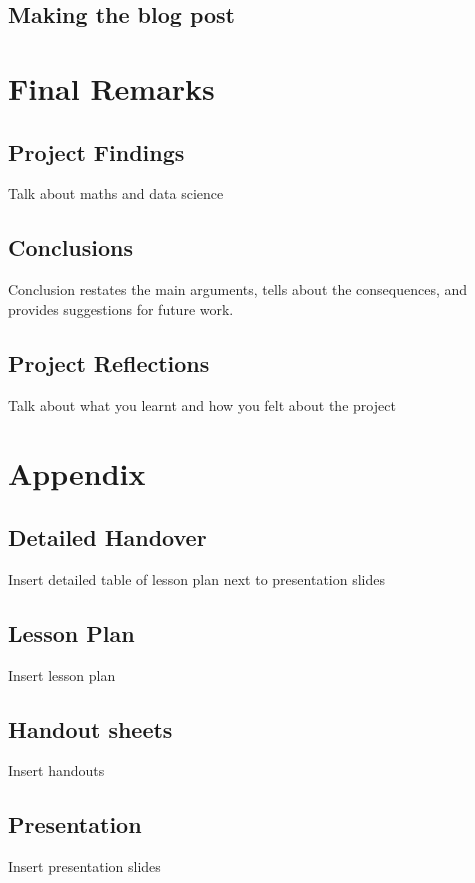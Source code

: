 \documentclass[12pt, a4paper,oneside]{book}
\numberwithin{equation}{section}
\begin{document}
\section{Making the blog post}\label{sec:x.x}


\chapter{Final Remarks}\label{ch:concl}
\section{Project Findings}
Talk about maths and data science

\section{Conclusions}
Conclusion restates the main arguments, tells about the consequences, and provides suggestions for future work.

\section{Project Reflections}
Talk about what you learnt and how you felt about the project

\chapter*{Appendix}
\appendix
{}

\section*{Detailed Handover}
Insert detailed table of lesson plan next to presentation slides

\section*{Lesson Plan}
Insert lesson plan

\section*{Handout sheets}\label{secx}
Insert handouts

\section*{Presentation}\label{secx.x}
Insert presentation slides
\end{document}
